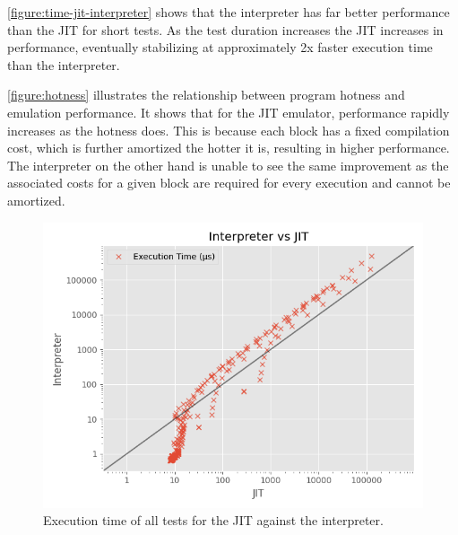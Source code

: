 




\autoref{figure:time-jit-interpreter} shows that the interpreter has far better performance than the JIT for short tests. As the test duration increases the JIT increases in performance, eventually stabilizing at approximately 2x faster execution time than the interpreter.

\autoref{figure:hotness} illustrates the relationship between program hotness and emulation performance. It shows that for the JIT emulator, performance rapidly increases as the hotness does. This is because each block has a fixed compilation cost, which is further amortized the hotter it is, resulting in higher performance. The interpreter on the other hand is unable to see the same improvement as the associated costs for a given block are required for every execution and cannot be amortized.

\begin{figure}[H]
    \centering
    \includegraphics[scale=0.75]{output/graphs/scatter/vs/JIT-vs-Interpreter-time.png}
    \caption{Execution time of all tests for the JIT against the interpreter.}
    \label{figure:time-jit-interpreter}
\end{figure}

